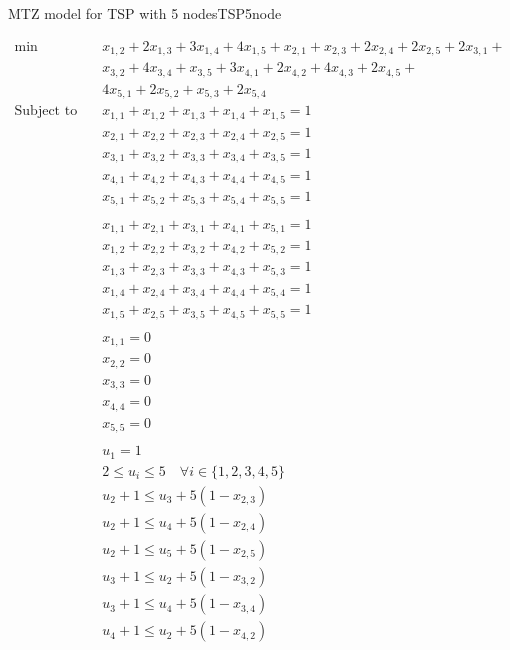 \begin{example}{MTZ model for TSP with 5 nodes}{TSP5node}

\begin{align*}\min\quad & x_{1,2} + 2 x_{1,3} + 3 x_{1,4} + 4 x_{1,5} + x_{2,1} + x_{2,3} + 2 x_{2,4} + 2 x_{2,5} + 2 x_{3,1} + \\&x_{3,2} + 4 x_{3,4} + x_{3,5} + 3 x_{4,1} + 2 x_{4,2} + 4 x_{4,3} + 2 x_{4,5} + \\&4 x_{5,1} + 2 x_{5,2} + x_{5,3} + 2 x_{5,4}\\
\text{Subject to} \quad  
 & x_{1,1} + x_{1,2} + x_{1,3} + x_{1,4} + x_{1,5} = 1\\
 & x_{2,1} + x_{2,2} + x_{2,3} + x_{2,4} + x_{2,5} = 1\\
 & x_{3,1} + x_{3,2} + x_{3,3} + x_{3,4} + x_{3,5} = 1\\
 & x_{4,1} + x_{4,2} + x_{4,3} + x_{4,4} + x_{4,5} = 1\\
 & x_{5,1} + x_{5,2} + x_{5,3} + x_{5,4} + x_{5,5} = 1\\
 \\
&x_{1,1} + x_{2,1} + x_{3,1} + x_{4,1} + x_{5,1} = 1\\
 & x_{1,2} + x_{2,2} + x_{3,2} + x_{4,2} + x_{5,2} = 1\\
 & x_{1,3} + x_{2,3} + x_{3,3} + x_{4,3} + x_{5,3} = 1\\
 & x_{1,4} + x_{2,4} + x_{3,4} + x_{4,4} + x_{5,4} = 1\\
 & x_{1,5} + x_{2,5} + x_{3,5} + x_{4,5} + x_{5,5} = 1\\
\\
 & x_{1,1} = 0\\
 & x_{2,2} = 0\\
 & x_{3,3} = 0\\
 & x_{4,4} = 0\\
 & x_{5,5} = 0\\
 \\
 & u_{1} = 1\\
 & 2 \leq u_{i} \leq 5 \quad\forall i \in \{1,2,3,4,5\}\\
 & u_{2} +1 \leq u_{3} + 5 (1-x_{2,3})\\
 & u_{2} +1 \leq u_{4} + 5  (1-x_{2,4})\\
  & u_{2} +1 \leq  u_{5} + 5 (1-x_{2,5} )\\
 & u_{3} +1 \leq u_{2} + 5  (1-x_{3,2})\\
 & u_{3} +1 \leq u_{4} + 5  (1-x_{3,4})\\
 & u_{4} +1 \leq u_{2} + 5  (1-x_{4,2})\\

\end{align*}
\end{example}

